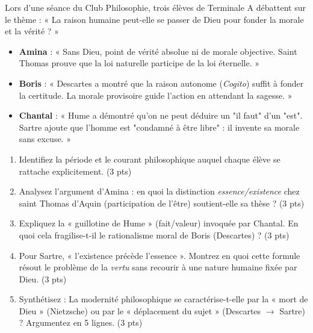 \documentclass[11pt]{article}
\begin{document}
\begin{exercice}
Lors d'une séance du Club Philosophie, trois élèves de Terminale A débattent sur le thème : « La raison humaine peut-elle se passer de Dieu pour fonder la morale et la vérité ? »

\begin{itemize}
    \item \textbf{Amina} : « Sans Dieu, point de vérité absolue ni de morale objective. Saint Thomas prouve que la loi naturelle participe de la loi éternelle. »
    \item \textbf{Boris} : « Descartes a montré que la raison autonome (\textit{Cogito}) suffit à fonder la certitude. La morale provisoire guide l'action en attendant la sagesse. »
    \item \textbf{Chantal} : « Hume a démontré qu'on ne peut déduire un "il faut" d'un "est". Sartre ajoute que l'homme est "condamné à être libre" : il invente sa morale sans excuse. »
\end{itemize}

\begin{enumerate}
    \item Identifiez la période et le courant philosophique auquel chaque élève se rattache explicitement. (3 pts)
    \item Analysez l'argument d'Amina : en quoi la distinction \textit{essence/existence} chez saint Thomas d'Aquin (participation de l'être) soutient-elle sa thèse ? (3 pts)
    \item Expliquez la « guillotine de Hume » (fait/valeur) invoquée par Chantal. En quoi cela fragilise-t-il le rationalisme moral de Boris (Descartes) ? (3 pts)
    \item Pour Sartre, « l'existence précède l'essence ». Montrez en quoi cette formule résout le problème de la \textit{vertu} sans recourir à une nature humaine fixée par Dieu. (3 pts)
    \item Synthétisez : La modernité philosophique se caractérise-t-elle par la « mort de Dieu » (Nietzsche) ou par le « déplacement du sujet » (Descartes $\to$ Sartre) ? Argumentez en 5 lignes. (3 pts)
\end{enumerate}
\end{exercice}
\end{document}
